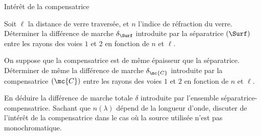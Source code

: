 \begin{exo}[PC][1][TD]{Intérêt de la compensatrice}
  \begin{quest}
    \item	Soit $\ell$ la distance de verre traversée, et $n$ l’indice de réfraction du verre. Déterminer la différence de marche $\delta_{\Surf}$ introduite par la séparatrice $(\Surf)$ entre les rayons des voies $1$ et $2$ en fonction de $n$ et $\ell$.
    \item On suppose que la compensatrice est de même épaisseur que la séparatrice. Déterminer de même la différence de marche $\delta_{\mc{C}}$ introduite par la compensatrice $(\mc{C})$ entre les rayons des voies $1$ et $2$ en fonction de $n$ et $\ell$. 
    \item En déduire la différence de marche totale $\delta$ introduite par l’ensemble séparatrice-compensatrice. Sachant que $n(\lambda)$ dépend de la longueur d’onde, discuter de l’intérêt de la compensatrice dans le cas où la source utilisée n’est pas monochromatique. 
  \end{quest}
  
\end{exo}

